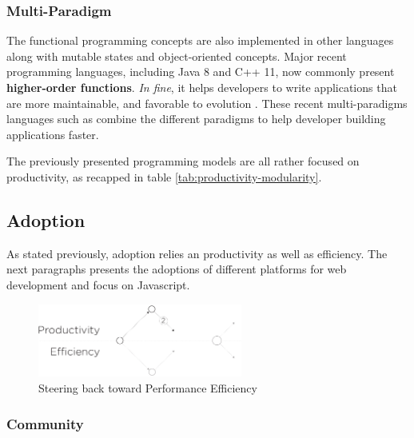\subsubsection{Multi-Paradigm}

The functional programming concepts are also implemented in other languages along with mutable states and object-oriented concepts.
Major recent programming languages, including Java 8 and C++ 11, now commonly present \textbf{higher-order functions}.
\textit{In fine}, it helps developers to write applications that are more maintainable, and favorable to evolution \cite{Hughes1989,Turner1981}.
These recent multi-paradigms languages such as  combine the different paradigms to help developer building applications faster.

\separator

The previously presented programming models are all rather focused on productivity, as recapped in table \ref{tab:productivity-modularity}.


\subsection{Adoption} \label{chapter3:software-productivity:adoption}

As stated previously, adoption relies an productivity as well as efficiency.
The next paragraphs presents the adoptions of different platforms for web development and focus on Javascript.

\begin{figure}[!h]
\begin{center}
\includegraphics[width=0.6\textwidth]{../resources/state-of-the-art-2.pdf}
\end{center}
\caption{Steering back toward Performance Efficiency}
\label{fig:state-of-the-art-2}
\end{figure}

\subsubsection{Community}

